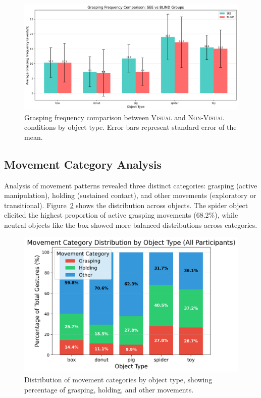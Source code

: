 \documentclass[conference]{IEEEtran}
\begin{document}
\begin{figure}[!b]
    \centering
    \includegraphics[width=\columnwidth]{group_main_analysis.png}
    \caption{Grasping frequency comparison between \textsc{Visual} and \textsc{Non-Visual} conditions by object type. Error bars represent standard error of the mean.}
    \label{fig:grasping-groups}
\end{figure}

\subsection{Movement Category Analysis}

Analysis of movement patterns revealed three distinct categories: grasping 
(active manipulation), holding (sustained contact), and other movements 
(exploratory or transitional). Figure~\ref{fig:movement-dist} shows the 
distribution across objects. The spider object elicited the highest 
proportion of active grasping movements (68.2\%), while neutral objects 
like the box showed more balanced distributions across categories.

\begin{figure}[!t]
    \centering
    \includegraphics[width=\columnwidth]{avg_grasping_analysis.png}
    \caption{Distribution of movement categories by object type, showing percentage of grasping, holding, and other movements.}
    \label{fig:movement-dist}
\end{figure}
\end{document}
